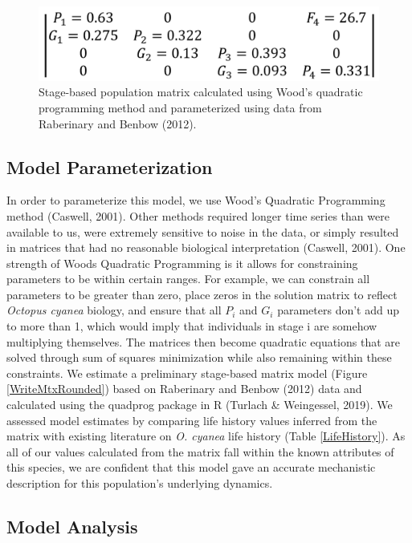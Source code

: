 \documentclass[
]{article}
\begin{document}
\begin{figure}
\includegraphics[width=1\linewidth]{MtxFilled} \caption{Stage-based population matrix calculated using Wood's quadratic programming method and parameterized using data from Raberinary and Benbow (2012). \label{WriteMtxRounded}}\label{fig:WriteMtxRounded}
\end{figure}

\hypertarget{model-parameterization}{%
\subsection{Model Parameterization}\label{model-parameterization}}

In order to parameterize this model, we use Wood's Quadratic Programming method (Caswell, 2001). Other methods required longer time series than were available to us, were extremely sensitive to noise in the data, or simply resulted in matrices that had no reasonable biological interpretation (Caswell, 2001). One strength of Woods Quadratic Programming is it allows for constraining parameters to be within certain ranges. For example, we can constrain all parameters to be greater than zero, place zeros in the solution matrix to reflect \emph{Octopus cyanea} biology, and ensure that all \(P_i\) and \(G_i\) parameters don't add up to more than 1, which would imply that individuals in stage i are somehow multiplying themselves. The matrices then become quadratic equations that are solved through sum of squares minimization while also remaining within these constraints. We estimate a preliminary stage-based matrix model (Figure \ref{WriteMtxRounded}) based on Raberinary and Benbow (2012) data and calculated using the quadprog package in R (Turlach \& Weingessel, 2019). We assessed model estimates by comparing life history values inferred from the matrix with existing literature on \emph{O. cyanea} life history (Table \ref{LifeHistory}). As all of our values calculated from the matrix fall within the known attributes of this species, we are confident that this model gave an accurate mechanistic description for this population's underlying dynamics.

\hypertarget{model-analysis}{%
\subsection{Model Analysis}\label{model-analysis}}
\end{document}
